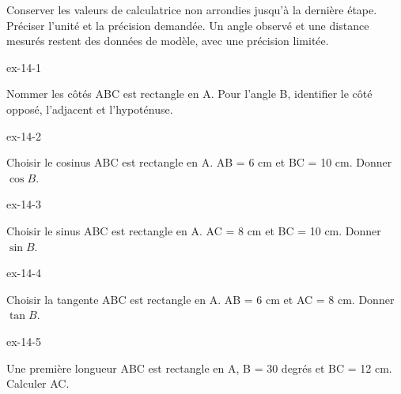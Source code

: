 \begin{attention}Conserver les valeurs de calculatrice non arrondies jusqu’à la dernière étape. Préciser l’unité et la précision demandée. Un angle observé et une distance mesurés restent des données de modèle, avec une précision limitée.\end{attention}
\clearpage{}
\begin{blocLivre}{ex-14-1}\begin{exercice}[1]{Nommer les côtés}
ABC est rectangle en A. Pour l’angle B, identifier le côté opposé, l’adjacent et l’hypoténuse.
\label{fig-ex-14-1}
\end{exercice}\end{blocLivre}
\begin{blocLivre}{ex-14-2}\begin{exercice}[1]{Choisir le cosinus}
ABC est rectangle en A. AB = 6 cm et BC = 10 cm. Donner $\cos B$.
\label{fig-ex-14-2}
\end{exercice}\end{blocLivre}
\begin{blocLivre}{ex-14-3}\begin{exercice}[1]{Choisir le sinus}
ABC est rectangle en A. AC = 8 cm et BC = 10 cm. Donner $\sin B$.
\label{fig-ex-14-3}
\end{exercice}\end{blocLivre}
\begin{blocLivre}{ex-14-4}\begin{exercice}[1]{Choisir la tangente}
ABC est rectangle en A. AB = 6 cm et AC = 8 cm. Donner $\tan B$.
\label{fig-ex-14-4}
\end{exercice}\end{blocLivre}
\begin{blocLivre}{ex-14-5}\begin{exercice}[1]{Une première longueur}
ABC est rectangle en A, B = 30 degrés et BC = 12 cm. Calculer AC.
\label{fig-ex-14-5}
\end{exercice}\end{blocLivre}

